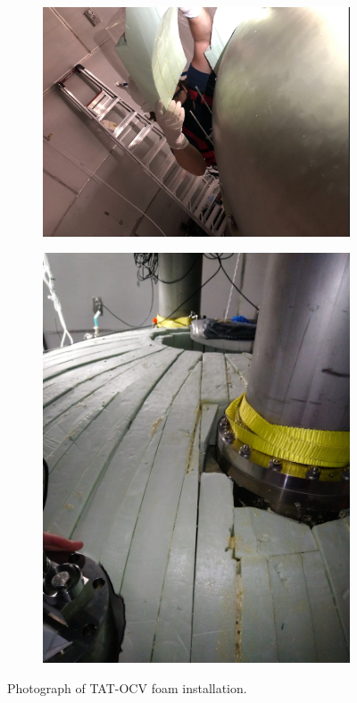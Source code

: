 \begin{figure}[!htbp]
\begin{subfigure}{.5\textwidth}
  \centering
  \includegraphics[width=\linewidth]{Figures/Construction/TAT_foam_installation.png}
  \end{subfigure}
  \begin{subfigure}{.5\textwidth}
  \centering
  \includegraphics[width=\linewidth]{Figures/Construction/TAT_foam_complete.jpg}
  \end{subfigure}
\caption{Photograph of TAT-OCV foam installation.}
\label{fig:TAT_foam_installation}
\end{figure}

